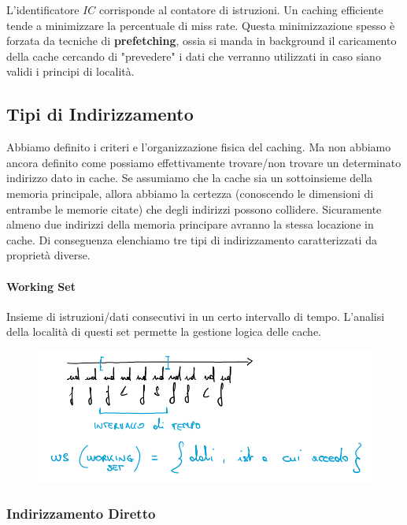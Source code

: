 \documentclass{article}
\begin{document}
L'identificatore $IC$ corrisponde al contatore di istruzioni. Un caching efficiente tende a minimizzare la percentuale di miss rate. Questa minimizzazione spesso è forzata da tecniche di \textbf{prefetching}, ossia si manda in background il caricamento della cache cercando di "prevedere" i dati che verranno utilizzati in caso siano validi i principi di località.

\newpage

\subsection{Tipi di Indirizzamento}

Abbiamo definito i criteri e l'organizzazione fisica del caching. Ma non abbiamo ancora definito come possiamo effettivamente trovare/non trovare un determinato indirizzo dato in cache. Se assumiamo che la cache sia un sottoinsieme della memoria principale, allora abbiamo la certezza (conoscendo le dimensioni di entrambe le memorie citate) che degli indirizzi possono collidere. Sicuramente almeno due indirizzi della memoria principare avranno la stessa locazione in cache. Di conseguenza elenchiamo tre tipi di indirizzamento caratterizzati da proprietà diverse.

\vspace*{15px}

\paragraph{Working Set} Insieme di istruzioni/dati consecutivi in un certo intervallo di tempo. \newline L'analisi della località di questi set permette la gestione logica delle cache.

\begin{figure}[htbp]
    \center
    \includegraphics[scale=0.50]{img/workingSet.png}
\end{figure}

\subsubsection{Indirizzamento Diretto}
\end{document}

